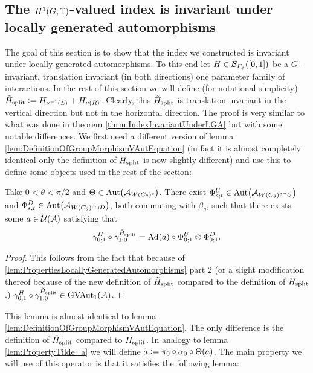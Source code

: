\documentclass[11pt,a4paper,twoside]{article}
\numberwithin{equation}{section}
\begin{document}
\subsection{The $H^1(G,\mathbb T)$-valued index is invariant under locally generated automorphisms}\label{sec:H1ValuedIndexInvariantUnderLGA's}
The goal of this section is to show that the index we constructed is invariant under locally generated automorphisms. To this end let $H\in \mathcal B_{F_\phi}([0,1])$ be a $G$-invariant, translation invariant (in both directions) one parameter family of interactions. In the rest of this section we will define (for notational simplicity) ${\tilde{H}_{\text{split}}}\vcentcolon= H_{\nu^{-1}(L)}+H_{\nu(R)}$. Clearly, this ${\tilde{H}_{\text{split}}}$ is translation invariant in the vertical direction but not in the horizontal direction. The proof is very similar to what was done in theorem \ref{thrm:IndexInvariantUnderLGA} but with some notable differences. We first need a different version of lemma \ref{lem:DefinitionOfGroupMorphismVAutEquation} (in fact it is almost completely identical only the definition of ${H_{\text{split}}}$ is now slightly different) and use this to define some objects used in the rest of the section:
\begin{lemma}\label{lem:DefinitionOfGroupMorphismVAutEquationTwoTranslations}
	Take $0<\theta<\pi/2$ and $\Theta\in \Aut{\AA_{W(C_\theta)^c}}$. There exist $\Phi^U_{s;t}\in\Aut{\AA_{W(C_\theta)^c\cap U}}$ and $\Phi^D_{s;t}\in\Aut{\AA_{W(C_\theta)^c\cap D}}$, both commuting with $\beta_g$, such that there exists some $a\in\mathcal U(\mathcal A)$ satisfying that
	\begin{equation}\label{eq:DefinitionOfGroupMorphismVAutEquationTwoTranslations}
	\gamma^H_{0;1}\circ\gamma^{\HsplitTilde}_{1;0}=\Ad{a}\circ \Phi^U_{0;1}\otimes\Phi^D_{0;1}.
	\end{equation}
\end{lemma}
\begin{proof}
	This follows from the fact that because of \ref{lem:PropertiesLocallyGeneratedAutomorphisms} part 2 (or a slight modification thereof because of the new definition of ${\tilde{H}_{\text{split}}}$ compared to the definition of ${H_{\text{split}}}$.) $\gamma^H_{0;1}\circ\gamma^{{\tilde{H}_{\text{split}}}}_{1;0}\in \textrm{GVAut}_1(\mathcal A)$.
\end{proof}
This lemma is almost identical to lemma \ref{lem:DefinitionOfGroupMorphismVAutEquation}. The only difference is the definition of ${\tilde{H}_{\text{split}}}$ compared to ${H_{\text{split}}}$. In analogy to lemma \ref{lem:PropertyTilde_a} we will define $\tilde{a}\vcentcolon= \pi_0\circ\alpha_0\circ\Theta(a)$. The main property we will use of this operator is that it satisfies the following lemma:
\end{document}
